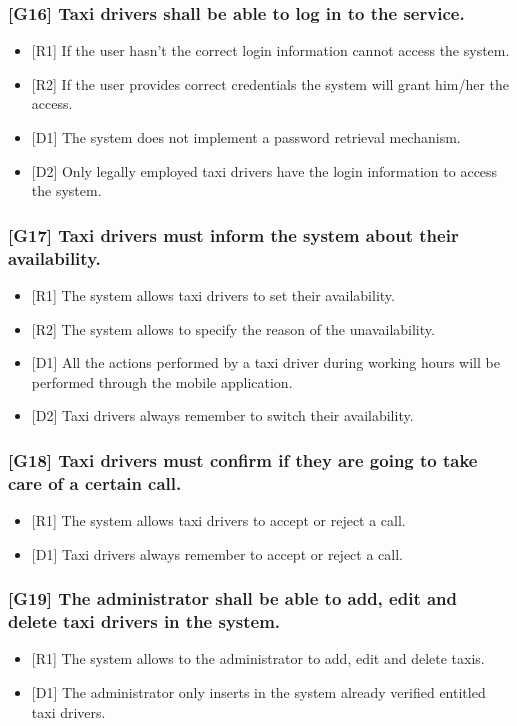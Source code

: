 \documentclass[a4paper,11pt]{report} %
\begin{document}
	\subsubsection{{[}G16{]} Taxi drivers shall be able to log in to the service.}
	\begin{itemize}
		\item {[}R1{]} If the user hasn't the correct login information cannot access the system.
		\item {[}R2{]} If the user provides correct credentials the system will grant him/her the access.
		\item {[}D1{]} The system does not implement a password retrieval mechanism.
		\item {[}D2{]} Only legally employed taxi drivers have the login information to access the system.
	\end{itemize}
	
	\subsubsection{{[}G17{]} Taxi drivers must inform the system about their availability.}
	\begin{itemize}
		\item {[}R1{]} The system allows taxi drivers to set their availability.
		\item {[}R2{]} The system allows to specify the reason of the unavailability.
		\item {[}D1{]} All the actions performed by a taxi driver during working hours will be performed through the mobile application.
		\item {[}D2{]} Taxi drivers always remember to switch their availability.
	\end{itemize}
	
	\subsubsection{{[}G18{]} Taxi drivers must confirm if they are going to take care of a certain call.}
	\begin{itemize}
		\item {[}R1{]} The system allows taxi drivers to accept or reject a call.
		\item {[}D1{]} Taxi drivers always remember to accept or reject a call.
	\end{itemize}	
					
	\subsubsection{{[}G19{]} The administrator shall be able to add, edit and delete taxi drivers in the system.}
	\begin{itemize}
		\item {[}R1{]} The system allows to the administrator to add, edit and delete taxis.
		\item {[}D1{]} The administrator only inserts in the system already verified entitled taxi drivers.
	\end{itemize}	
	
\end{document}
